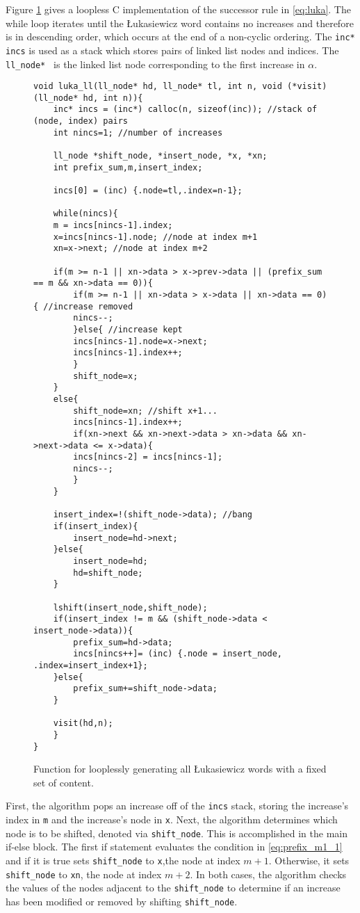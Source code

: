 Figure \ref{fig:lukaCode} gives a loopless C implementation of the successor rule in \eqref{eq:luka}.  The while loop iterates until the Łukasiewicz word contains no increases and therefore is in descending order, which occurs at the end of a non-cyclic ordering.  The \verb$inc* incs$ is used as a stack which stores pairs of linked list nodes and indices.  The \verb$ll_node* $ is the linked list node corresponding to the first increase in $\alpha$.  

\begin{figure}
\begin{Verbatim}
void luka_ll(ll_node* hd, ll_node* tl, int n, void (*visit)(ll_node* hd, int n)){
    inc* incs = (inc*) calloc(n, sizeof(inc)); //stack of (node, index) pairs
    int nincs=1; //number of increases

    ll_node *shift_node, *insert_node, *x, *xn;
    int prefix_sum,m,insert_index;

    incs[0] = (inc) {.node=tl,.index=n-1};

    while(nincs){
	m = incs[nincs-1].index;
	x=incs[nincs-1].node; //node at index m+1
	xn=x->next; //node at index m+2

	if(m >= n-1 || xn->data > x->prev->data || (prefix_sum == m && xn->data == 0)){
	    if(m >= n-1 || xn->data > x->data || xn->data == 0){ //increase removed
		nincs--;
	    }else{ //increase kept
		incs[nincs-1].node=x->next;
		incs[nincs-1].index++;
	    }
	    shift_node=x;
	}
	else{ 
	    shift_node=xn; //shift x+1...
	    incs[nincs-1].index++;
	    if(xn->next && xn->next->data > xn->data && xn->next->data <= x->data){
		incs[nincs-2] = incs[nincs-1];
		nincs--;
	    }
	}

	insert_index=!(shift_node->data); //bang
	if(insert_index){
	    insert_node=hd->next;
	}else{
	    insert_node=hd;
	    hd=shift_node;
	}

	lshift(insert_node,shift_node);
	if(insert_index != m && (shift_node->data < insert_node->data)){
	    prefix_sum=hd->data;
	    incs[nincs++]= (inc) {.node = insert_node, .index=insert_index+1};
	}else{
	    prefix_sum+=shift_node->data;
	}

	visit(hd,n);
    }
}
\end{Verbatim}

\caption{Function for looplessly generating all Łukasiewicz words with a fixed set of content.}
\label{fig:lukaCode}
\end{figure}

First, the algorithm pops an increase off of the \verb$incs$ stack, storing the increase's index in \verb$m$ and the increase's node in \verb$x$.  Next, the algorithm determines which node is to be shifted, denoted via \verb$shift_node$.  This is accomplished in the main if-else block.  The first if statement evaluates the condition in \eqref{eq:prefix_m1_1} and if it is true sets \verb$shift_node$ to \verb$x$,the node at index $m+1$. Otherwise, it sets \verb$shift_node$ to \verb$xn$, the node at index $m+2$.  In both cases, the algorithm checks the values of the nodes adjacent to the \verb$shift_node$ to determine if an increase has been modified or removed by shifting \verb$shift_node$.

